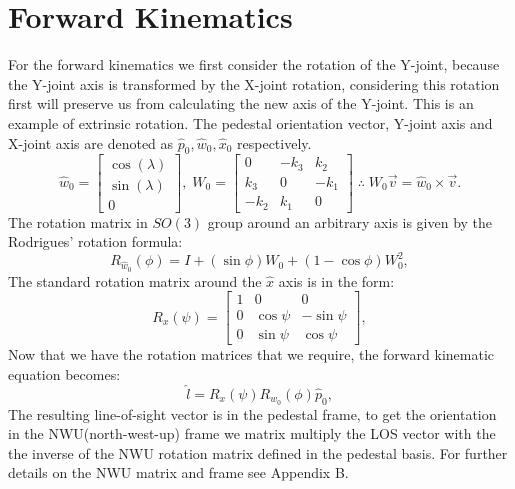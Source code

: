 \documentclass[a4paper,onecolumn,11pt]{article}
\begin{document}
\normalsize
\section{Forward Kinematics}
For the forward kinematics we first consider the rotation of the Y-joint,
because the Y-joint axis is transformed by the X-joint rotation, considering
this rotation first will preserve us from calculating the new axis of the
Y-joint. This is an example of extrinsic rotation. The pedestal orientation
vector, Y-joint axis and X-joint axis are denoted as $\hat p_0, \hat w_0, \hat
x_0$ respectively.
\begin{equation}
    \hat w_0 = \begin{bmatrix}
            \cos(\lambda) \\
            \sin(\lambda) \\
            0
        \end{bmatrix} , \;
    W_0 = \begin{bmatrix}
        0 & -k_3 & k_2 \\
        k_3 & 0 & -k_1 \\
        -k_2 & k_1 & 0
    \end{bmatrix}
    \; \therefore \; W_0 \vec v = \hat w_0 \times \vec v.
\end{equation}
The rotation matrix in $SO(3)$ group around an arbitrary axis is given by the 
Rodrigues' rotation formula:
\begin{equation}
    R_{\hat w_0}(\phi) = I + (\sin \phi) W_0 + (1 - \cos \phi) W_0^2,
\end{equation}
The standard rotation matrix around the $\hat x$ axis is in the form:
\begin{equation}
    R_x ( \psi ) = \begin{bmatrix}
        1 & 0 & 0 \\
        0 & \cos \psi & -\sin \psi \\
        0 & \sin \psi & \cos \psi
    \end{bmatrix},
\end{equation}
Now that we have the rotation matrices that we require, the forward kinematic
equation becomes:
\begin{equation}
    \hat l = R_x ( \psi ) R_{w_0} ( \phi ) \hat p_0,
\end{equation}
The resulting line-of-sight vector is in the pedestal frame, to get the
orientation in the NWU(north-west-up) frame we matrix multiply the
LOS vector with the the inverse of the NWU rotation matrix defined in the 
pedestal basis. For further details on the NWU matrix and frame see Appendix B.
\end{document}
